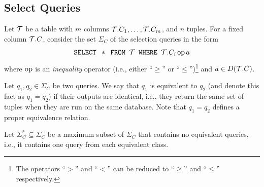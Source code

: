 \subsection{Select Queries}\label{sec:vcfreqvcdimselqueries}
Let ${\cal T}$ be a table with $m$ columns ${\cal T}.C_1,\dotsc,{\cal T}.C_m$, and $n$
tuples. For a fixed column ${\cal T}.C$, consider the set $\Sigma_C$ of the
selection queries in the form 
\begin{equation}\label{eq:vcfreqselect}
\mbox{\texttt{SELECT }} *\mbox{\texttt{ FROM }} {\cal T} \mbox{\texttt{ WHERE }}
{\cal T}.C_i \operatorname{op} a \end{equation}
where $\operatorname{op}$ is an \emph{inequality} operator (i.e., either ``$\ge$'' or
``$\le$'')\footnote{The operators
``$>$'' and ``$<$'' can be reduced to ``$\ge$'' and ``$\le$'' respectively.} and
$a\in D({\cal T}.C)$. 

Let $q_1,q_2\in\Sigma_C$ be two queries. We say that $q_1$ is equivalent to
$q_2$ (and denote this fact as $q_1=q_2$) if their outputs are identical, i.e.,
they return the same set of tuples when they are run on the same database. Note
that $q_1=q_2$ defines a proper equivalence relation. 

Let $\Sigma^*_C \subseteq \Sigma_C$ be a maximum subset of $\Sigma_C$ that
contains no equivalent queries, i.e., it contains one query from each equivalent
class.
%
%


